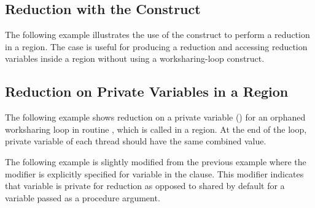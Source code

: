 




\subsection{Reduction with the  Construct}
\label{subsec:reduction_scope}

The following example illustrates the use of the  construct 
to perform a reduction in a  region. The case is useful for 
producing a reduction and accessing reduction variables inside a  region 
without using a worksharing-loop construct.

\clearpage


\subsection{Reduction on Private Variables in a  Region}
\label{subsec:priv_reduction}

The following example shows reduction on a private variable ()
for an orphaned worksharing loop in routine ,
which is called in a  region.
At the end of the loop, private variable of each thread should have the same combined value.

The following example is slightly modified from the previous example 
where the  modifier is explicitly specified
for variable  in the  clause.
This modifier indicates that variable  is private
for reduction as opposed to shared by default for a variable
passed as a procedure argument.

